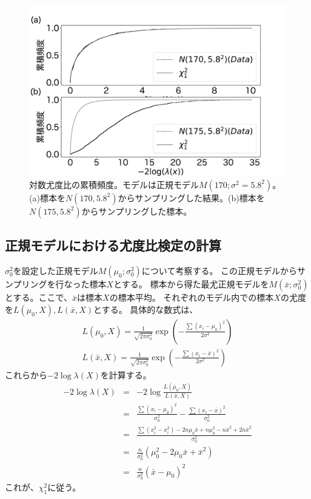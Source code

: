 \begin{figure}
    \begin{center}
        \includegraphics[width=15cm]{./image/04_/loglikeli_norm_test.pdf}
        \caption{対数尤度比の累積頻度。モデルは正規モデル$M(170;\sigma^2=5.8^2)$。(a)標本を$N(170,5.8^2)$からサンプリングした結果。(b)標本を$N(175,5.8^2)$からサンプリングした標本。}
        \label{fig:loglikelihood_test_simulation_norm}

      \end{center}
    \end{figure}

\subsection{正規モデルにおける尤度比検定の計算}

$\sigma^2_0$を設定した正規モデル$M(\mu_0;\sigma^2_0)$について考察する。
この正規モデルからサンプリングを行なった標本$X$とする。
標本から得た最尤正規モデルを$M(\bar{x};\sigma^2_0)$とする。ここで、$\bar{x}$は標本$X$の標本平均。
それぞれのモデル内での標本$X$の尤度を$L(\mu_0,X),L(\bar{x},X)$とする。
具体的な数式は、
\begin{eqnarray*}
    L(\mu_0,X)=\frac{1}{\sqrt{2\pi\sigma_0^2}}\exp(-\frac{\sum(x_i-\mu_0)^2}{2\sigma^2})\\
    L(\bar{x},X)=\frac{1}{\sqrt{2\pi\sigma_0^2}}\exp(-\frac{\sum(x_i-\bar{x})^2}{2\sigma^2})
\end{eqnarray*}
これらから$-2\log \lambda(X)$を計算する。
\begin{eqnarray*}
 -2\log\lambda(X) &=& -2\log\frac{L(\mu_0,X)}{L(\bar{x},X)} \\
 &=&\frac{ \sum (x_i-\mu_0)^2}{\sigma^2_0}-\frac{\sum (x_i-\bar{x})^2}{\sigma_0^2} \\
 &=& \frac{ \sum(x_i^2-x_i^2) -2n\mu_0\bar{x} +n\mu_0^2-n\bar{x}^2 +2n\bar{x}^2} {\sigma_0^2}\\
&=& \frac{n}{\sigma_0^2}(\mu_0^2 -2\mu_0\bar{x} +\bar{x}^2)  \\
 &=& \frac{n}{\sigma^2_0}(\bar{x}-\mu_0)^2 
\end{eqnarray*}
これが、$\chi^2_1$に従う。



